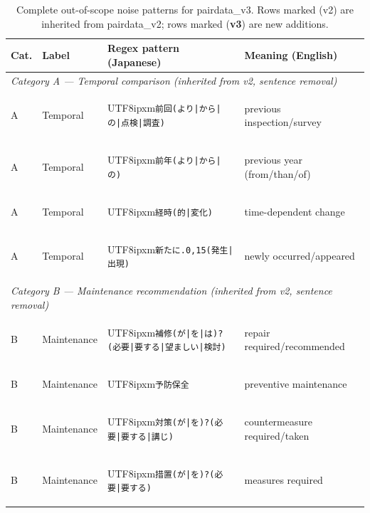 \documentclass[onecolumn]{article}
\begin{document}
\begin{table}[h]
\centering
\caption{Complete out-of-scope noise patterns for pairdata\_v3.
         Rows marked (v2) are inherited from pairdata\_v2;
         rows marked (\textbf{v3}) are new additions.}
\label{tab:u2_noise_patterns}
\small
\begin{tabular}{p{0.5cm} p{1.7cm} p{5.8cm} p{4.5cm}}
\toprule
\textbf{Cat.} & \textbf{Label} & \textbf{Regex pattern (Japanese)} & \textbf{Meaning (English)} \\
\midrule
\multicolumn{4}{l}{\textit{Category A --- Temporal comparison (inherited from v2, sentence removal)}} \\
A & Temporal & \begin{CJK}{UTF8}{ipxm}\texttt{前回(より|から|の|点検|調査)}\end{CJK} & previous inspection/survey \\
A & Temporal & \begin{CJK}{UTF8}{ipxm}\texttt{前年(より|から|の)}\end{CJK} & previous year (from/than/of) \\
A & Temporal & \begin{CJK}{UTF8}{ipxm}\texttt{経時(的|変化)}\end{CJK} & time-dependent change \\
A & Temporal & \begin{CJK}{UTF8}{ipxm}\texttt{新たに.{0,15}(発生|出現)}\end{CJK} & newly occurred/appeared \\
\midrule
\multicolumn{4}{l}{\textit{Category B --- Maintenance recommendation (inherited from v2, sentence removal)}} \\
B & Maintenance & \begin{CJK}{UTF8}{ipxm}\texttt{補修(が|を|は)?(必要|要する|望ましい|検討)}\end{CJK} & repair required/recommended \\
B & Maintenance & \begin{CJK}{UTF8}{ipxm}\texttt{予防保全}\end{CJK} & preventive maintenance \\
B & Maintenance & \begin{CJK}{UTF8}{ipxm}\texttt{対策(が|を)?(必要|要する|講じ)}\end{CJK} & countermeasure required/taken \\
B & Maintenance & \begin{CJK}{UTF8}{ipxm}\texttt{措置(が|を)?(必要|要する)}\end{CJK} & measures required \\

\end{tabular}
\end{table}
\end{document}
